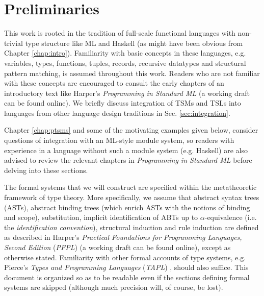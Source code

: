 
\section{Preliminaries}\label{sec:preliminaries}
This work is rooted in the tradition of full-scale functional languages with non-trivial type structure like ML and Haskell (as might have been obvious from Chapter \ref{chap:intro}). Familiarity with basic concepts in these languages, e.g. variables, types, functions, tuples, records,  recursive datatypes and structural pattern matching, is assumed throughout this work. Readers who are not familiar with these concepts are encouraged to consult the early chapters of an introductory text like Harper's \emph{Programming in Standard ML} \cite{harper1997programming} (a working draft can be found online). We briefly discuss integration of TSMs and TSLs into languages from other language design traditions in Sec. \ref{sec:integration}.

Chapter \ref{chap:ptsms} and some of the motivating examples given below, consider questions of integration with an ML-style module system, so readers with experience in a language without such a module system (e.g. Haskell) are also advised to review the relevant chapters in \emph{Programming in Standard ML} \cite{harper1997programming} before delving into these sections.

The formal systems that we will construct are specified within the metatheoretic framework of type theory. More specifically, we assume that abstract syntax trees (ASTs), abstract binding trees (which enrich ASTs with the notions of binding and scope), substitution, implicit identification of ABTs up to $\alpha$-equivalence (i.e. the \emph{identification convention}), structural induction and rule induction are defined as described in Harper's \emph{Practical Foundations for Programming Languages, Second Edition} (\emph{PFPL}) \cite{pfpl} (a working draft can be found online), except as otherwise stated. Familiarity with other formal accounts of type systems, e.g. Pierce's \emph{Types and Programming Languages} (\emph{TAPL}) \cite{tapl}, should also suffice. This document is organized so as to be readable even if the sections defining formal systems are skipped (although much precision will, of course, be lost).

